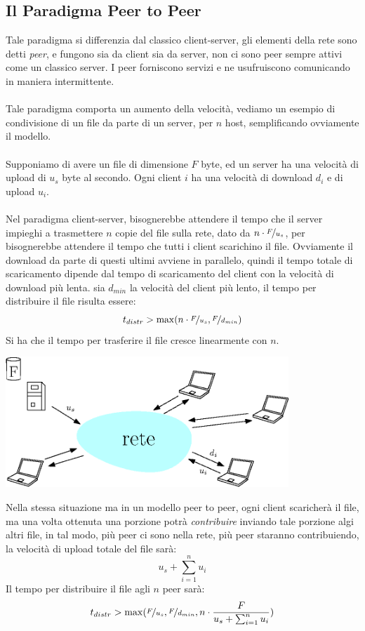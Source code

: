 \documentclass[12pt, letterpaper]{article}
\newcommand{\acc}{\\\hphantom{}\\}
\begin{document}
\subsection{Il Paradigma Peer to Peer}
Tale paradigma si differenzia dal classico client-server, gli elementi della rete sono detti \textit{peer},
e fungono sia da client sia da server, non ci sono peer sempre attivi come un classico server. I peer forniscono
servizi e ne usufruiscono comunicando in maniera intermittente.\acc
Tale paradigma comporta un aumento della velocità, vediamo un esempio di condivisione di un file da
parte di un server, per $n$ host, semplificando ovviamente il modello. \acc
Supponiamo di avere un file di dimensione $F$ byte, ed un server ha una velocità di upload di $u_s$ byte
al secondo. Ogni client $i$ ha una velocità di download $d_i$ e di upload  $u_i$.\acc
Nel paradigma client-server, bisognerebbe attendere il tempo che il server impieghi a trasmettere $n$
copie del file
sulla rete, dato da $n\cdot\nicefrac{ F}{u_s}$, per bisognerebbe attendere il tempo che tutti i client scarichino il
file. Ovviamente il download da parte di questi ultimi avviene in parallelo, quindi il tempo totale di scaricamento
dipende dal tempo di scaricamento del client con la velocità di download più lenta. sia $d_{min}$ la velocità
del client più lento, il tempo per distribuire il file risulta essere:
$$t_{distr}>\max(n\cdot\nicefrac{ F}{u_s},\nicefrac{F}{d_{min}} )$$
Si ha che il tempo per trasferire il file cresce linearmente con $n$.
\begin{center}
    \includegraphics[width=0.8\textwidth ]{images/nFile.eps}
\end{center}
Nella stessa situazione ma in un modello peer to peer, ogni client scaricherà il file, ma
una volta ottenuta una porzione potrà \textit{contribuire} inviando tale porzione algi altri file, in tal modo,
più peer ci sono nella rete, più peer staranno contribuiendo, la velocità di upload totale del file
sarà: $$\displaystyle u_s +\sum_{i=1}^n u_i$$
Il tempo per distribuire il file agli $n$ peer sarà:$$
    t_{distr}>\max(\nicefrac{ F}{u_s},\nicefrac{ F}{d_{min}},n\cdot \dfrac{F}{u_s +\sum_{i=1}^n u_i})
$$
\end{document}
